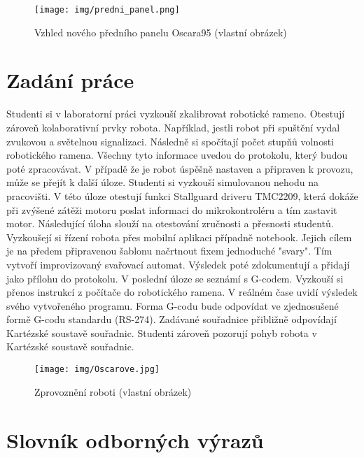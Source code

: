 \begin{figure}
		\begin{center}
			\texttt{[image: img/predni\_panel.png]}
			\caption{Vzhled nového předního panelu Oscara95 (vlastní obrázek)}
			\label{fig:predni_panel}
		\end{center}
		\vspace{-2mm}
	\end{figure}

\section{Zadání práce}

Studenti si v laboratorní práci vyzkouší zkalibrovat robotické rameno. Otestují zároveň kolaborativní prvky robota. Například, jestli robot při spuštění vydal zvukovou a světelnou signalizaci. Následně si spočítají počet stupňů volnosti robotického ramena. Všechny tyto informace uvedou do protokolu, který budou poté zpracovávat. V případě že je robot úspěšně nastaven a připraven k provozu, může se přejít k další úloze. Studenti si vyzkouší simulovanou nehodu na pracovišti. V této úloze otestují funkci Stallguard driveru TMC2209, která dokáže při zvýšené zátěži motoru poslat informaci do mikrokontroléru a tím zastavit motor. Následující úloha slouží na otestování zručnosti a přesnosti studentů. Vyzkoušejí si řízení robota přes mobilní aplikaci případně notebook. Jejich cílem je na předem připravenou šablonu načrtnout fixem jednoduché "svary". Tím vytvoří improvizovaný svařovací automat. Výsledek poté zdokumentují a přidají jako přílohu do protokolu. V poslední úloze se seznámí s G-codem. Vyzkouší si přenos instrukcí z počítače do robotického ramena. V reálném čase uvidí výsledek svého vytvořeného programu. Forma G-codu bude odpovídat ve zjednosušené formě G-codu standardu (RS-274). Zadávané souřadnice přibližně odpovídají Kartézské soustavě souřadnic. Studenti zároveň pozorují pohyb robota v Kartézské soustavě souřadnic.  \cite{G-code-wiki}

\begin{figure}
		\begin{center}
			\texttt{[image: img/Oscarove.jpg]}
			\caption{Zprovoznění roboti (vlastní obrázek)}
			\label{fig:Oscarove}
		\end{center}
		\vspace{-2mm}
	\end{figure}

\section{Slovník odborných výrazů}

